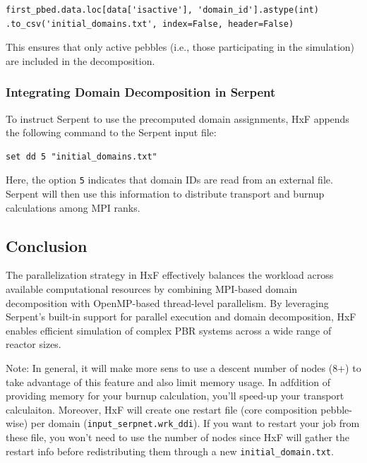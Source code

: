 \documentclass{article}
\begin{document}
\begin{verbatim}
first_pbed.data.loc[data['isactive'], 'domain_id'].astype(int)
.to_csv('initial_domains.txt', index=False, header=False)
\end{verbatim}

This ensures that only active pebbles (i.e., those participating in the simulation) are included in the decomposition.

\subsubsection{Integrating Domain Decomposition in Serpent}

To instruct Serpent to use the precomputed domain assignments, HxF appends the following command to the Serpent input file:

\begin{verbatim}
set dd 5 "initial_domains.txt"
\end{verbatim}

Here, the option \texttt{5} indicates that domain IDs are read from an external file. Serpent will then use this information to distribute transport and burnup calculations among MPI ranks.

\subsection{Conclusion}

The parallelization strategy in HxF effectively balances the workload across available computational resources by combining MPI-based domain decomposition with OpenMP-based thread-level parallelism. By leveraging Serpent's built-in support for parallel execution and domain decomposition, HxF enables efficient simulation of complex PBR systems across a wide range of reactor sizes.

Note: In general, it will make more sens to use a descent number of nodes (8+) to take advantage of this feature and also limit memory usage. In adfdition of providing memory for your burnup calculation, you'll speed-up  your transport calculaiton. Moreover, HxF will create one restart file (core composition pebble-wise) per domain (\texttt{input\_serpnet.wrk\_ddi}). If you want to restart your job from these file, you won't need to use the number of nodes since HxF will gather the restart info before redistributing them through a new \texttt{initial\_domain.txt}.

    

\newpage
\appendix
\end{document}
